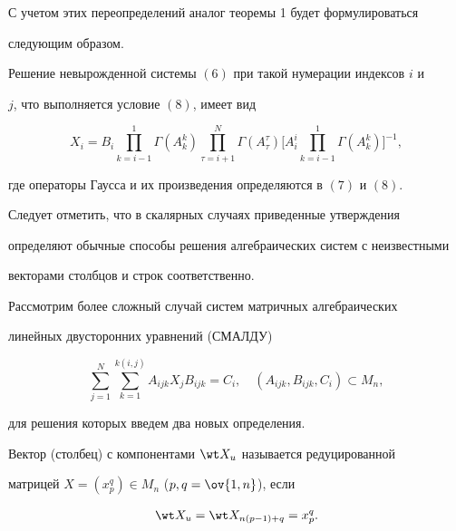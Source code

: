  


С учетом этих переопределений аналог теоремы 1 будет формулироваться 


следующим образом. 


 


\begin{thm} 


Решение невырожденной системы $(6)$ при такой нумерации индексов $i$ и 


$j$, что выполняется условие $(8)$, имеет вид 


$$ 


X_i=B_i\prod^1_{k=i-1}\Gamma(A^k_k)\prod^N_{\tau=i+1} 


\Gamma(A^\tau_\tau)\bigg[A^i_i\prod^1_{k=i-1} 


\Gamma(A^k_k)\bigg]^{-1}, 


$$ 


где операторы Гаусса и их произведения определяются в $(7)$ и $(8)$. 


\end{thm} 


 


Следует отметить, что в скалярных случаях приведенные утверждения 


определяют обычные способы решения алгебраических систем с неизвестными 


векторами столбцов и строк соответственно. 


 


Рассмотрим более сложный случай систем матричных алгебраических 


линейных двусторонних уравнений (СМАЛДУ) 


\begin{equation} 


\sum^N_{j=1}\sum^{k(i,j)}_{k=1}A_{ijk}X_j B_{ijk}=C_i,


\quad (A_{ijk},B_{ijk},C_i)\subset M_n, 


\end{equation} 


для решения которых введем два новых определения. 


 


\begin{defn} 


Вектор (столбец) с компонентами $\wt X_u$ называется редуцированной 


матрицей $X=(x^q_p)\in M_n$ ($p,q=\ov{1,n}$), если 


\begin{equation} 


\wt X_u=\wt X_{n(p-1)+q}=x^q_p. 


\end{equation} 


\end{defn} 



